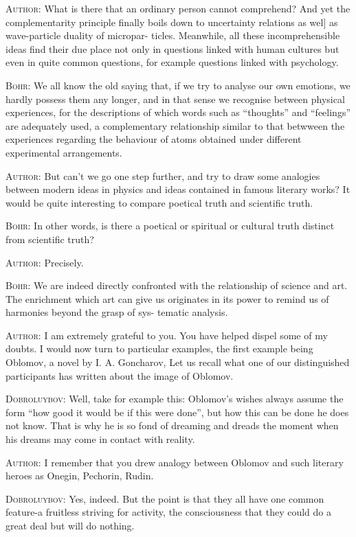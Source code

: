 \documentclass[a4paper,sfsidenotes,colorlinks=true]{tufte-book}
\numberwithin{equation}{section}
\numberwithin{figure}{section}
\begin{document}
\textsc{Author:} What is there that an ordinary person cannot
comprehend? And yet the complementarity principle finally boils down
to uncertainty relations as wel] as wave-particle duality of
micropar- ticles. Meanwhile, all these incomprehensible ideas find
their due place not only in questions linked with human cultures but
even in quite common questions, for example questions linked with
psychology.  

\textsc{Bohr:} We all know the old saying that, if we try to analyse our
own emotions, we hardly possess them any longer, and in that sense we
recognise between physical experiences, for the descriptions of which
words such as ``thoughts'' and ``feelings'' are adequately used, a
complementary relationship similar to that betwween the experiences
regarding the behaviour of atoms obtained under different experimental
arrangements.  

\textsc{Author:} But can't we go one step further, and try to draw some
analogies between modern ideas in physics and ideas contained in
famous literary works? It would be quite interesting to compare
poetical truth and scientific truth.  


\textsc{Bohr:} In other words, is there a poetical or spiritual or
cultural truth distinct from scientific truth?

\textsc{Author:} Precisely. 

\textsc{Bohr:} We are indeed directly confronted with the relationship of
science and art. The enrichment which art can give us originates in
its power to remind us of harmonies beyond the grasp of sys- tematic
analysis.


\textsc{Author:} I am extremely grateful to you. You have helped dispel some
of my doubts. I would now turn to particular examples, the first
example being Oblomov, a novel by I. A. Goncharov, Let us recall what
one of our distinguished participants has written about the image of
Oblomov.


\textsc{Dobroluybov:} Well, take for example this: Oblomov's wishes
always assume the form ``how good it would be if this were done'', but
how this can be done he does not know. That is why he is so fond of
dreaming and dreads the moment when his dreams may come in contact
with reality.


\textsc{Author:} I remember that you drew analogy between Oblomov and
such literary heroes as Onegin, Pechorin, Rudin.

\textsc{Dobroluybov:} Yes, indeed. But the point is that they all have
one common feature-a fruitless striving for activity, the
consciousness that they could do a great deal but will do nothing.
\end{document}
